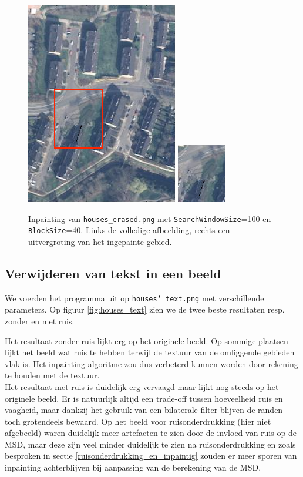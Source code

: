 \documentclass[titlepage]{article}
\begin{document}
\begin{figure}[!ht]
    \centering
    \captionsetup{justification=centering}
    \includegraphics[width=.4\textwidth]{houses_erased_40_100}
    \quad
    \includegraphics[width=.4\textwidth]{houses_erased_40_100_zoomed}
    \caption{Inpainting van \texttt{houses\_erased.png} met \texttt{SearchWindowSize}=100 en \texttt{BlockSize}=40. Links de volledige afbeelding, rechts een uitvergroting van het ingepainte gebied.} 
    \label{fig:houses_erased_b}
\end{figure}
\FloatBarrier
\subsection{Verwijderen van tekst in een beeld}
We voerden het programma uit op \texttt{houses\char`_text.png} met verschillende parameters. Op figuur \ref{fig:houses_text} zien we de twee beste resultaten resp. zonder en met ruis.

Het resultaat zonder ruis lijkt erg op het originele beeld. Op sommige plaatsen lijkt het beeld wat ruis te hebben terwijl de textuur van de omliggende gebieden vlak is. Het inpainting-algoritme zou dus verbeterd kunnen worden door rekening te houden met de textuur.\\
Het resultaat met ruis is duidelijk erg vervaagd maar lijkt nog steeds op het originele beeld. Er is natuurlijk altijd een trade-off tussen hoeveelheid ruis en vaagheid, maar dankzij het gebruik van een bilaterale filter blijven de randen toch grotendeels bewaard. Op het beeld voor ruisonderdrukking (hier niet afgebeeld) waren duidelijk meer artefacten te zien door de invloed van ruis op de MSD, maar deze zijn veel minder duidelijk te zien na ruisonderdrukking en zoals besproken in sectie \ref{ruisonderdrukking_en_inpaintig} zouden er meer sporen van inpainting achterblijven bij aanpassing van de berekening van de MSD.
\end{document}
